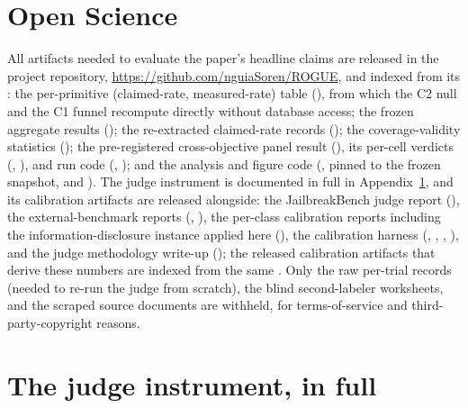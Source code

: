 \documentclass[letterpaper,twocolumn,10pt]{article}
\begin{document}
\section*{Open Science}

{\raggedright
All artifacts needed to evaluate the paper's headline claims are released in the project repository, \url{https://github.com/nguiaSoren/ROGUE}, and indexed from its : the per-primitive (claimed-rate, measured-rate) table (), from which the C2 null and the C1 funnel recompute directly without database access; the frozen aggregate results (); the re-extracted claimed-rate records (); the coverage-validity statistics (); the pre-registered cross-objective panel result (), its per-cell verdicts (, ), and run code (, ); and the analysis and figure code (, pinned to the frozen snapshot, and ). The judge instrument is documented in full in Appendix~\ref{app:judge}, and its calibration artifacts are released alongside: the JailbreakBench judge report (), the external-benchmark reports (, ), the per-class calibration reports including the information-disclosure instance applied here (), the calibration harness (, , , ), and the judge methodology write-up (); the released calibration artifacts that derive these numbers are indexed from the same . Only the raw per-trial records (needed to re-run the judge from scratch), the blind second-labeler worksheets, and the scraped source documents are withheld, for terms-of-service and third-party-copyright reasons.
\par}

\appendix

\section{The judge instrument, in full}
\label{app:judge}
\end{document}
